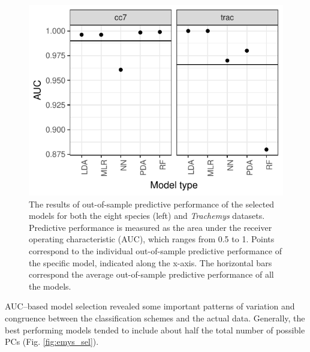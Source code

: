 \documentclass[12pt,letterpaper]{article}
\begin{document}
\begin{figure}[ht]
  \centering
  \includegraphics[height = \textheight, width = \textwidth, keepaspectratio = true]{figure/other_oos_sel}
  \caption{The results of out-of-sample predictive performance of the selected models for both the eight species (left) and \textit{Trachemys} datasets. Predictive performance is measured as the area under the receiver operating characteristic (AUC), which ranges from 0.5 to 1. Points correspond to the individual out-of-sample predictive performance of the specific model, indicated along the x-axis. The horizontal bars correspond the average out-of-sample predictive performance of all the models.}
  \label{fig:other_oos}
\end{figure}


AUC--based model selection revealed some important patterns of variation and congruence between the classification schemes and the actual data. Generally, the best performing models tended to include about half the total number of possible PCs (Fig. \ref{fig:emys_sel}). 
\end{document}
